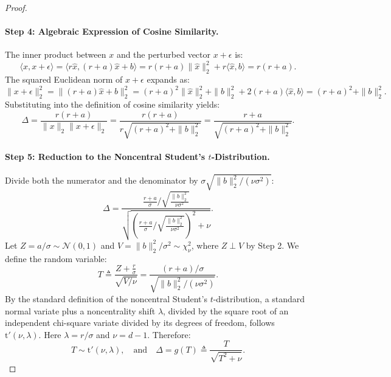 \begin{proof}
\paragraph{Step 4: Algebraic Expression of Cosine Similarity.}
The inner product between $x$ and the perturbed vector $x + \epsilon$ is:
\begin{equation}
\langle x, x + \epsilon \rangle = \langle r \hat{x}, (r + a)\hat{x} + b \rangle = r(r + a) \|\hat{x}\|_2^2 + r \langle \hat{x}, b \rangle = r(r + a).
\end{equation}
The squared Euclidean norm of $x + \epsilon$ expands as:
\begin{equation}
\|x + \epsilon\|_2^2 = \|(r + a)\hat{x} + b\|_2^2 = (r + a)^2 \|\hat{x}\|_2^2 + \|b\|_2^2 + 2(r + a)\langle \hat{x}, b \rangle = (r + a)^2 + \|b\|_2^2.
\end{equation}
Substituting into the definition of cosine similarity yields:
\begin{equation}
\Delta = \frac{r(r + a)}{\|x\|_2 \|x + \epsilon\|_2} = \frac{r(r + a)}{r \sqrt{(r + a)^2 + \|b\|_2^2}} = \frac{r + a}{\sqrt{(r + a)^2 + \|b\|_2^2}}.
\end{equation}

\paragraph{Step 5: Reduction to the Noncentral Student's $t$-Distribution.}
Divide both the numerator and the denominator by $\sigma \sqrt{\|b\|_2^2 / (\nu \sigma^2)}$:
\begin{equation}
\Delta = \frac{ \frac{r + a}{\sigma} \Big/ \sqrt{\frac{\|b\|_2^2}{\nu \sigma^2}} }{ \sqrt{ \left( \frac{r + a}{\sigma} \Big/ \sqrt{\frac{\|b\|_2^2}{\nu \sigma^2}} \right)^2 + \nu } }.
\end{equation}
Let $Z = a / \sigma \sim \mathcal{N}(0, 1)$ and $V = \|b\|_2^2 / \sigma^2 \sim \chi^2_\nu$, where $Z \perp V$ by Step 2. We define the random variable:
\begin{equation}
T \triangleq \frac{Z + \frac{r}{\sigma}}{\sqrt{V / \nu}} = \frac{(r + a)/\sigma}{\sqrt{\|b\|_2^2 / (\nu \sigma^2)}}.
\end{equation}
By the standard definition of the noncentral Student's $t$-distribution, a standard normal variate plus a noncentrality shift $\lambda$, divided by the square root of an independent chi-square variate divided by its degrees of freedom, follows $\mathrm{t}'(\nu, \lambda)$. Here $\lambda = r / \sigma$ and $\nu = d - 1$. Therefore:
\begin{equation}
T \sim \mathrm{t}'(\nu, \lambda), \quad \text{and} \quad \Delta = g(T) \triangleq \frac{T}{\sqrt{T^2 + \nu}}.
\end{equation}


\end{proof}
